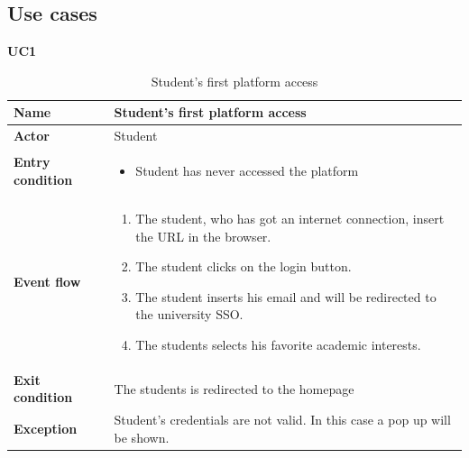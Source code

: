 \pagebreak
\subsection{Use cases}

    \textbf{UC1}
    \begin{table}[H]
    \centering
    \begin{tabular}{|l|p{11.9cm}|}
        \hline
        \textbf{Name}            & Student's first platform access                     \\\hline
        \textbf{Actor}           & Student         \\\hline
        \textbf{Entry condition} &
        \begin{itemize}
              \item Student has never accessed the platform
        \end{itemize}                                        \\\hline
        \textbf{Event flow}      &
        \begin{enumerate}[label=\arabic*.]
              \item The student, who has got an internet connection, insert the URL in the browser.
              \item The student clicks on the login button.
              \item The student inserts his email and will be redirected to the university SSO.
              \item The students selects his favorite academic interests.
        \end{enumerate}            \\\hline
        \textbf{Exit condition}  & The students is redirected to the homepage\\\hline
        \textbf{Exception}       &  Student's credentials are not valid. In this case a pop up will be shown.   \\\hline
    \end{tabular}
    \caption{Student's first platform access}
    \label{table:Student's first platform access}
    \end{table}

